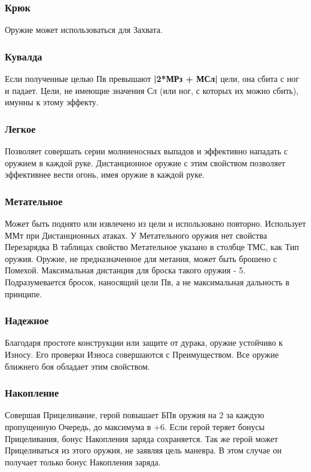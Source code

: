 \subsubsection{Крюк} Оружие может использоваться для Захвата.
\subsubsection{Кувалда} Если полученные целью Пв превышают \textbf{|2*МРз + МСл|} цели, она сбита с ног и падает. Цели, не имеющие значения Сл (или ног, с которых их можно сбить), имунны к этому эффекту. 
\subsubsection{Легкое} Позволяет совершать серии молниеносных выпадов и эффективно нападать с оружием в каждой руке. 
\newline Дистанционное оружие с этим свойством позволяет эффективнее вести огонь, имея оружие в каждой руке.
\subsubsection{Метательное} Может быть поднято или извлечено из цели и использовано повторно. Использует ММт при Дистанционных атаках.  
\newline У Метательного оружия нет свойства Перезарядка  
\newline В таблицах свойство Метательное указано в столбце ТМС, как Тип оружия. 
\newline Оружие, не предназначенное для метания, может быть брошено с Помехой. Максимальная дистанция для броска такого оружия - 5. Подразумевается бросок, наносящий цели Пв, а не максимальная дальность в принципе.
\subsubsection{Надежное} Благодаря простоте конструкции или защите от дурака, оружие устойчиво к Износу. Его проверки Износа совершаются с Преимуществом. Все оружие ближнего боя обладает этим свойством.
\subsubsection{Накопление} Совершая Прицеливание, герой повышает БПв оружия на 2 за каждую пропущенную Очередь, до максимума в +6. Если герой теряет бонусы Прицеливания, бонус Накопления заряда сохраняется.  
\newline Так же герой может Прицеливаться из этого оружия, не заявляя цель маневра. В этом случае он получает только бонус Накопления заряда.
